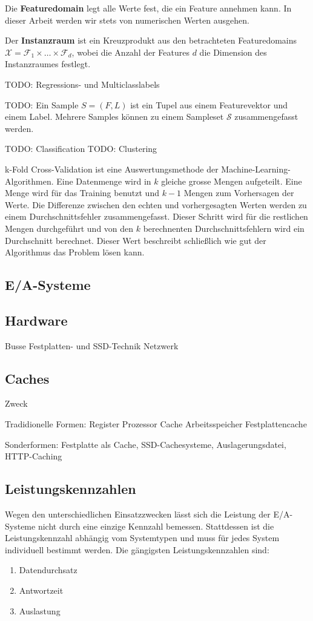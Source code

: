 Die \textbf{Featuredomain} legt alle Werte fest, die ein Feature annehmen kann. In dieser Arbeit werden wir stets von numerischen Werten ausgehen.

Der \textbf{Instanzraum} ist ein Kreuzprodukt aus den betrachteten Featuredomains $\mathscr{X} = \mathscr{F}_1 \times \dots \times \mathscr{F}_d$, wobei die Anzahl der Features $d$ die Dimension des Instanzraumes festlegt.

TODO: Regressions- und Multiclasslabels

TODO: Ein Sample $S = (F, L)$ ist ein Tupel aus einem Featurevektor und einem Label. Mehrere Samples können zu einem Sampleset $\mathcal{S}$ zusammengefasst werden.

TODO: Classification
TODO: Clustering

k-Fold Cross-Validation ist eine Auswertungsmethode der Machine-Learning-Algorithmen. Eine Datenmenge wird in $k$ gleiche grosse Mengen aufgeteilt. Eine Menge wird für das Training benutzt und $k-1$ Mengen zum Vorhersagen der Werte. Die Differenze zwischen den echten und vorhergesagten Werten werden zu einem Durchschnittsfehler zusammengefasst. Dieser Schritt wird für die restlichen Mengen durchgeführt und von den $k$ berechnenten Durchschnittsfehlern wird ein Durchschnitt berechnet. Dieser Wert beschreibt schließlich wie gut der Algorithmus das Problem lösen kann.

\subsection{E/A-Systeme}


\subsection{Hardware}
Busse
Festplatten- und SSD-Technik
Netzwerk


\subsection{Caches}
Zweck

Tradidionelle Formen:
Register
Prozessor Cache
Arbeitsspeicher
Festplattencache

Sonderformen: Festplatte als Cache, SSD-Cachesysteme, Auslagerungsdatei, HTTP-Caching


\subsection{Leistungskennzahlen}
Wegen den unterschiedlichen Einsatzzwecken lässt sich die Leistung der E/A-Systeme nicht durch eine einzige Kennzahl bemessen. Stattdessen ist die Leistungskennzahl abhängig vom Systemtypen und muss für jedes System individuell bestimmt werden. Die gängigsten Leistungskennzahlen sind:
\begin{enumerate}
	\item Datendurchsatz
	\item Antwortzeit
	\item Auslastung
\end{enumerate}


